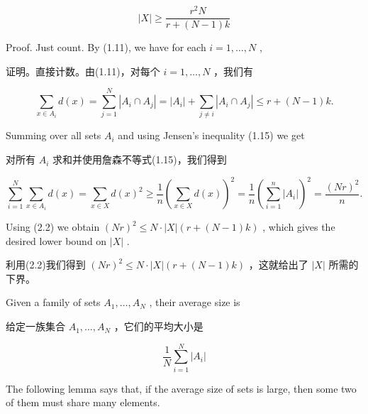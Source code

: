 \documentclass[10pt]{article}
\begin{document}
\[
\left| X\right|  \geq  \frac{{r}^{2}N}{r + \left( {N - 1}\right) k} \tag{2.1}
\]

Proof. Just count. By (1.11), we have for each \(i = 1,\ldots ,N\) ,

\begin{tcolorbox}\relax
证明。直接计数。由(1.11)，对每个 \(i = 1,\ldots ,N\) ，我们有
\end{tcolorbox}

\[
\mathop{\sum }\limits_{{x \in  {A}_{i}}}d\left( x\right)  = \mathop{\sum }\limits_{{j = 1}}^{N}\left| {{A}_{i} \cap  {A}_{j}}\right|  = \left| {A}_{i}\right|  + \mathop{\sum }\limits_{{j \neq  i}}\left| {{A}_{i} \cap  {A}_{j}}\right|  \leq  r + \left( {N - 1}\right) k. \tag{2.2}
\]

Summing over all sets \({A}_{i}\) and using Jensen’s inequality (1.15) we get

\begin{tcolorbox}\relax
对所有 \({A}_{i}\) 求和并使用詹森不等式(1.15)，我们得到
\end{tcolorbox}

\[
\mathop{\sum }\limits_{{i = 1}}^{N}\mathop{\sum }\limits_{{x \in  {A}_{i}}}d\left( x\right)  = \mathop{\sum }\limits_{{x \in  X}}d{\left( x\right) }^{2} \geq  \frac{1}{n}{\left( \mathop{\sum }\limits_{{x \in  X}}d\left( x\right) \right) }^{2} = \frac{1}{n}{\left( \mathop{\sum }\limits_{{i = 1}}^{n}\left| {A}_{i}\right| \right) }^{2} = \frac{{\left( Nr\right) }^{2}}{n}.
\]

Using (2.2) we obtain \({\left( Nr\right) }^{2} \leq  N \cdot  \left| X\right| \left( {r + \left( {N - 1}\right) k}\right)\) , which gives the desired lower bound on \(\left| X\right|\) .

\begin{tcolorbox}\relax
利用(2.2)我们得到 \({\left( Nr\right) }^{2} \leq  N \cdot  \left| X\right| \left( {r + \left( {N - 1}\right) k}\right)\) ，这就给出了 \(\left| X\right|\) 所需的下界。
\end{tcolorbox}

Given a family of sets \({A}_{1},\ldots ,{A}_{N}\) , their average size is

\begin{tcolorbox}\relax
给定一族集合 \({A}_{1},\ldots ,{A}_{N}\) ，它们的平均大小是
\end{tcolorbox}

\[
\frac{1}{N}\mathop{\sum }\limits_{{i = 1}}^{N}\left| {A}_{i}\right|
\]

The following lemma says that, if the average size of sets is large, then some two of them must share many elements.
\end{document}
